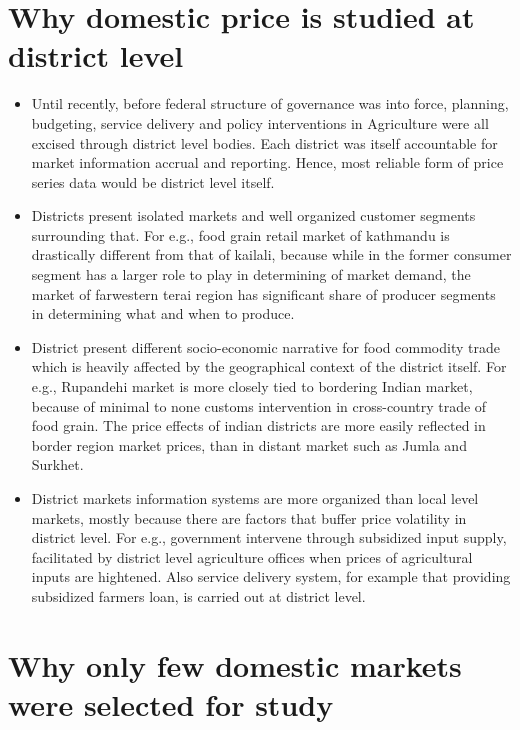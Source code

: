\documentclass[
  12pt,
]{article}
\providecommand{\tightlist}{%
  \setlength{\itemsep}{0pt}\setlength{\parskip}{0pt}}
\begin{document}
\hypertarget{why-domestic-price-is-studied-at-district-level}{%
\section{Why domestic price is studied at district level}\label{why-domestic-price-is-studied-at-district-level}}

\begin{itemize}
\tightlist
\item
  Until recently, before federal structure of governance was into force, planning, budgeting, service delivery and policy interventions in Agriculture were all excised through district level bodies. Each district was itself accountable for market information accrual and reporting. Hence, most reliable form of price series data would be district level itself.
\item
  Districts present isolated markets and well organized customer segments surrounding that. For e.g., food grain retail market of kathmandu is drastically different from that of kailali, because while in the former consumer segment has a larger role to play in determining of market demand, the market of farwestern terai region has significant share of producer segments in determining what and when to produce.
\item
  District present different socio-economic narrative for food commodity trade which is heavily affected by the geographical context of the district itself. For e.g., Rupandehi market is more closely tied to bordering Indian market, because of minimal to none customs intervention in cross-country trade of food grain. The price effects of indian districts are more easily reflected in border region market prices, than in distant market such as Jumla and Surkhet.
\item
  District markets information systems are more organized than local level markets, mostly because there are factors that buffer price volatility in district level. For e.g., government intervene through subsidized input supply, facilitated by district level agriculture offices when prices of agricultural inputs are hightened. Also service delivery system, for example that providing subsidized farmers loan, is carried out at district level.
\end{itemize}

\hypertarget{why-only-few-domestic-markets-were-selected-for-study}{%
\section{Why only few domestic markets were selected for study}\label{why-only-few-domestic-markets-were-selected-for-study}}
\end{document}

